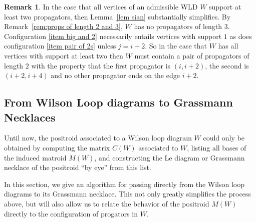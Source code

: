 \documentclass[11pt]{article}
\theoremstyle{remark}
\theoremstyle{definition}
\newtheorem{rmk}[thm]{Remark}
\begin{document}
%
%
%
%
%
%
%


\begin{rmk}
In the case that all vertices of an admissible WLD $W$ support at least two propagators, then Lemma~\ref{lem sian} substantially simplifies.  By Remark~\ref{rem:props of length 2 and 3}, $W$ has no propagators of length $3$.  Configuration \ref{item big and 2} necessarily entails vertices with support $1$ as does configuration \ref{item pair of 2s} unless $j=i+2$.  So in the case that $W$ has all vertices with support at least two then $W$ must contain a pair of propagators of length $2$  with the property that the first propagator is $(i, i+2)$, the second is $(i+2, i+4)$ and no other propagator ends on the edge $i+2$.
\end{rmk}


\subsection{From Wilson Loop diagrams to Grassmann Necklaces}\label{sec:GN alg}

Until now, the positroid associated to a Wilson loop diagram $W$ could only be obtained by computing the matrix $C(W)$ associated to $W$, listing all bases of the induced matroid $M(W)$, and constructing the Le diagram or Grassmann necklace of the positroid ``by eye'' from this list. 

In this section, we give an algorithm for passing directly from the Wilson loop diagrams to its Grassmann necklace. This not only greatly simplifies the process above, but will also allow us to relate the behavior of the positroid $M(W)$ directly to the configuration of progators in $W$.
\end{document}
